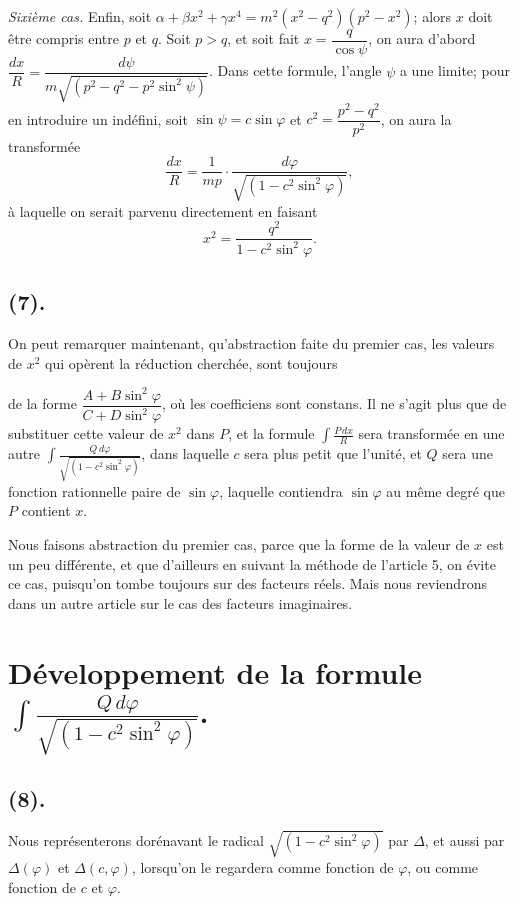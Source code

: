 \documentclass{article}
\begin{document}
\emph{Sixième cas.} Enfin, soit $\alpha+\beta x^{2}+\gamma x^{4}=m^{2}(x^{2}-q^{2})(p^{2}-x^{2})$; alors $x$ doit être compris entre $p$ et $q$. Soit $p>q$, et soit fait $x=\dfrac{q}{\cos\psi}$, on aura d'abord $\dfrac{dx}{R}=\dfrac{d\psi}{m\sqrt{(p^{2}-q^{2}-p^{2}\sin^{2}\psi)}}$. Dans cette formule, l'angle $\psi$ a une limite; pour en introduire un indéfini, soit $\sin\psi=c\sin\varphi$ et $c^{2}=\dfrac{p^{2}-q^{2}}{p^{2}}$, on aura la transformée
\[ \frac{dx}{R}=\frac{1}{mp}\cdot\frac{d\varphi}{\sqrt{(1-c^{2}\sin^{2}\varphi)}}, \]
à laquelle on serait parvenu directement en faisant
\[ x^{2}=\frac{q^{2}}{1-c^{2}\sin^{2}\varphi}. \]

\subsection*{(7).}

On peut remarquer maintenant, qu'abstraction faite du premier cas, les valeurs de $x^{2}$ qui opèrent la réduction cherchée, sont toujours

de la forme $\dfrac{A+B\sin^{2}\varphi}{C+D\sin^{2}\varphi}$, où les coefficiens sont constans. Il ne s'agit plus que de substituer cette valeur de $x^{2}$ dans $P$, et la formule $\displaystyle\int\frac{P\,dx}{R}$ sera transformée en une autre $\displaystyle\int\frac{Q\,d\varphi}{\sqrt{(1-c^{2}\sin^{2}\varphi)}}$, dans laquelle $c$ sera plus petit que l'unité, et $Q$ sera une fonction rationnelle paire de $\sin\varphi$, laquelle contiendra $\sin\varphi$ au même degré que $P$ contient $x$.

Nous faisons abstraction du premier cas, parce que la forme de la valeur de $x$ est un peu différente, et que d'ailleurs en suivant la méthode de l'article 5, on évite ce cas, puisqu'on tombe toujours sur des facteurs réels. Mais nous reviendrons dans un autre article sur le cas des facteurs imaginaires.

\section*{Développement de la formule $\displaystyle\int\frac{Q\,d\varphi}{\sqrt{(1-c^{2}\sin^{2}\varphi)}}$.}

\subsection*{(8).}

Nous représenterons dorénavant le radical $\sqrt{(1-c^{2}\sin^{2}\varphi)}$ par $\Delta$, et aussi par $\Delta(\varphi)$ et $\Delta(c,\varphi)$, lorsqu'on le regardera comme fonction de $\varphi$, ou comme fonction de $c$ et $\varphi$.
\end{document}
